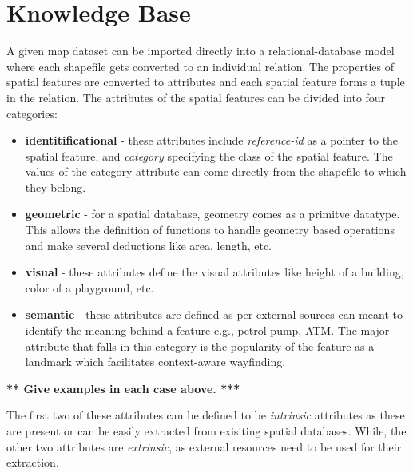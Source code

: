 \documentclass{iitkthesis}
\begin{document}
 \section{Knowledge Base}
  \label{sec:kbase}
A given map dataset can be imported directly into a relational-database 
model where each shapefile gets converted to an individual relation. The 
properties of spatial features are converted to attributes and each 
spatial feature forms a tuple in the relation. The attributes of the 
spatial features can be divided into four categories:
\begin{itemize}
\item \textbf{identitificational} - these attributes include 
\textit{reference-id} as a pointer to the spatial feature, and 
\textit{category} specifying the class of the spatial feature. The values 
of the category attribute can come directly from the shapefile to which 
they belong.
\item \textbf{geometric} - for a spatial database, geometry comes as a primitve datatype. This allows the definition of functions to handle geometry based operations and make several deductions like area, length, etc.
  \item \textbf{visual} -  these attributes define the visual attributes like height of a building, color of a playground, etc.
  \item \textbf{semantic} - these attributes are defined as per external sources can meant to identify the meaning behind a feature e.g., petrol-pump, ATM.  The major attribute that falls in this category is the popularity of the feature as a landmark which facilitates context-aware wayfinding.
\end{itemize}

{\bf *** Give examples in each case above. ***}

The first two of these attributes can be defined to be \textit{intrinsic} 
attributes as these are present or can be easily extracted from exisiting 
spatial databases. While, the other two attributes are \textit{extrinsic}, 
as external resources need to be used for their extraction.
\end{document}
